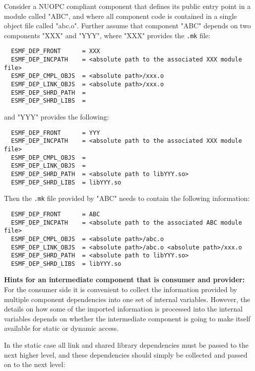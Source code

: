 Consider a NUOPC compliant component that defines its public entry point in a module called "ABC", and where all component code is contained in a single object file called "abc.o". Further assume that component "ABC" depends on two components "XXX" and "YYY", where "XXX" provides the {\tt .mk} file:
\begin{verbatim}
  ESMF_DEP_FRONT      = XXX
  ESMF_DEP_INCPATH    = <absolute path to the associated XXX module file>
  ESMF_DEP_CMPL_OBJS  = <absolute path>/xxx.o
  ESMF_DEP_LINK_OBJS  = <absolute path>/xxx.o
  ESMF_DEP_SHRD_PATH  = 
  ESMF_DEP_SHRD_LIBS  = 
\end{verbatim}
and "YYY" provides the following:
\begin{verbatim}
  ESMF_DEP_FRONT      = YYY
  ESMF_DEP_INCPATH    = <absolute path to the associated XXX module file>
  ESMF_DEP_CMPL_OBJS  = 
  ESMF_DEP_LINK_OBJS  = 
  ESMF_DEP_SHRD_PATH  = <absolute path to libYYY.so>
  ESMF_DEP_SHRD_LIBS  = libYYY.so
\end{verbatim}
Then the {\tt .mk} file provided by "ABC" needs to contain the following information:
\begin{verbatim}
  ESMF_DEP_FRONT      = ABC
  ESMF_DEP_INCPATH    = <absolute path to the associated ABC module file>
  ESMF_DEP_CMPL_OBJS  = <absolute path>/abc.o
  ESMF_DEP_LINK_OBJS  = <absolute path>/abc.o <absolute path>/xxx.o
  ESMF_DEP_SHRD_PATH  = <absolute path to libYYY.so>
  ESMF_DEP_SHRD_LIBS  = libYYY.so
\end{verbatim}

{\bf Hints for an intermediate component that is consumer and provider:} For the consumer side it is convenient to collect the information provided by multiple component dependencies into one set of internal variables. However, the details on how some of the imported information is processed into the internal variables depends on whether the intermediate component is going to make itself available for static or dynamic access.

In the static case all link and shared library dependencies must be passed to the next higher level, and these dependencies should simply be collected and passed on to the next level:

